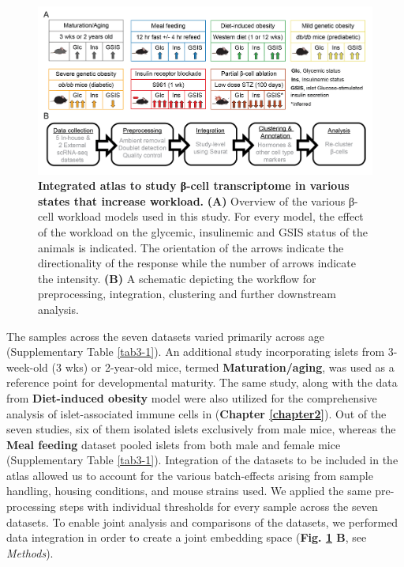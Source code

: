 \begin{figure}[H]
\centering
\includegraphics[width=\linewidth]{Chapter5/Fig/F3-1-v2-02.png}
\caption[Workflow to build an integrated atlas to study β-cell transcriptome]{\textbf{Integrated atlas to study β-cell transcriptome in various states that increase workload.} \textbf{(A)} Overview of the various β-cell workload models used in this study. For every model, the effect of the workload on the glycemic, insulinemic and GSIS status of the animals is indicated. The orientation of the arrows indicate the directionality of the response while the number of arrows indicate the intensity. \textbf{(B)} A schematic depicting the workflow for preprocessing, integration, clustering and further downstream analysis.}
\label{fig:3-1}
\end{figure}


The samples across the seven datasets varied primarily across age (Supplementary Table \ref{tab3-1}). An additional study incorporating islets from 3-week-old (3 wks) or 2-year-old mice, termed \textbf{Maturation/aging}, was used as a reference point for developmental maturity. The same study, along with the data from \textbf{Diet-induced obesity} model were also utilized for the comprehensive analysis of islet-associated immune cells in (\textbf{Chapter \ref{chapter2}}). Out of the seven studies, six of them isolated islets exclusively from male mice, whereas the \textbf{Meal feeding} dataset pooled islets from both male and female mice (Supplementary Table \ref{tab3-1}). Integration of the datasets to be included in the atlas allowed us to account for the various batch-effects arising from sample handling, housing conditions, and mouse strains used. We applied the same pre-processing steps with individual thresholds for every sample across the seven datasets. To enable joint analysis and comparisons of the datasets, we performed data integration in order to create a joint embedding space (\textbf{Fig. \ref{fig:3-1} B}, see \textit{Methods}).\\

